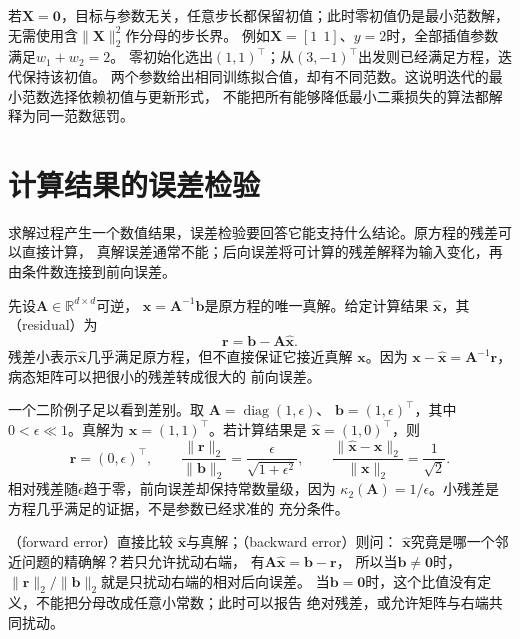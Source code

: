 若$\bm X=\bm0$，目标与参数无关，任意步长都保留初值；此时零初值仍是最小范数解，
无需使用含$\lVert\bm X\rVert_2^2$作分母的步长界。
例如$\bm X=[1\ \ 1]$、$y=2$时，全部插值参数满足$w_1+w_2=2$。
零初始化选出$(1,1)^{\top}$；从$(3,-1)^{\top}$出发则已经满足方程，迭代保持该初值。
两个参数给出相同训练拟合值，却有不同范数。这说明迭代的最小范数选择依赖初值与更新形式，
不能把所有能够降低最小二乘损失的算法都解释为同一范数惩罚。

\section{计算结果的误差检验}
\label{sec:matrix-analysis-error-verification}

求解过程产生一个数值结果，误差检验要回答它能支持什么结论。原方程的残差可以直接计算，
真解误差通常不能；后向误差将可计算的残差解释为输入变化，再由条件数连接到前向误差。

先设$\bm{A}\in\mathbb{R}^{d\times d}$可逆，
$\bm{x}=\bm{A}^{-1}\bm{b}$是原方程的唯一真解。给定计算结果
$\widehat{\bm{x}}$，其
（residual）为
\begin{equation}
  \bm{r}=\bm{b}-\bm{A}\widehat{\bm{x}}.
  \label{eq:matrix-analysis-residual}
\end{equation}
残差小表示$\widehat{\bm{x}}$几乎满足原方程，但不直接保证它接近真解
$\bm{x}$。因为
$\bm{x}-\widehat{\bm{x}}=\bm{A}^{-1}\bm{r}$，病态矩阵可以把很小的残差转成很大的
前向误差。

一个二阶例子足以看到差别。取
$\bm{A}=\operatorname{diag}(1,\epsilon)$、
$\bm{b}=(1,\epsilon)^{\top}$，其中$0<\epsilon\ll1$。真解为
$\bm{x}=(1,1)^{\top}$。若计算结果是
$\widehat{\bm{x}}=(1,0)^{\top}$，则
\[
  \bm{r}=(0,\epsilon)^{\top},\qquad
  \frac{\lVert\bm{r}\rVert_2}{\lVert\bm{b}\rVert_2}
  =\frac{\epsilon}{\sqrt{1+\epsilon^2}},
  \qquad
  \frac{\lVert\widehat{\bm{x}}-\bm{x}\rVert_2}
       {\lVert\bm{x}\rVert_2}
  =\frac{1}{\sqrt{2}}.
\]
相对残差随$\epsilon$趋于零，前向误差却保持常数量级，因为
$\kappa_2(\bm{A})=1/\epsilon$。小残差是方程几乎满足的证据，不是参数已经求准的
充分条件。

（forward error）直接比较
$\widehat{\bm{x}}$与真解；（backward error）则问：
$\widehat{\bm{x}}$究竟是哪一个邻近问题的精确解？若只允许扰动右端，
有$\bm{A}\widehat{\bm{x}}=\bm{b}-\bm{r}$，
所以当$\bm{b}\neq\bm{0}$时，
$\lVert\bm{r}\rVert_2/\lVert\bm{b}\rVert_2$就是只扰动右端的相对后向误差。
当$\bm{b}=\bm{0}$时，这个比值没有定义，不能把分母改成任意小常数；此时可以报告
绝对残差，或允许矩阵与右端共同扰动。

